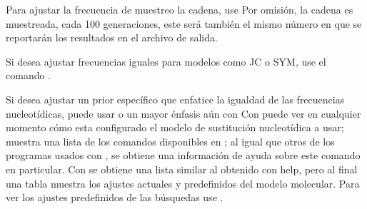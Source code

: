 Para ajustar la frecuencia de muestreo la cadena, use 
Por omisi\'on, la cadena es muestreada, cada 100 generaciones, este ser\'a tambi\'en el mismo n\'umero en que se reportar\'an los resultados en el archivo de salida.

Si  desea ajustar frecuencias iguales para modelos como JC o SYM, use el comando . 

Si desea ajustar un prior espec\'ifico que enfatice la igualdad de las frecuencias nucleot\'idicas,  puede usar 
o un mayor \'enfasis a\'un con 
Con  puede ver en cualquier momento c\'omo esta configurado el modelo de sustituci\'on nucleot\'idica a usar;  muestra una lista de los comandos disponibles en ; al igual que otros de los programas usados con , se obtiene una informaci\'on de ayuda sobre este comando en particular. Con  se obtiene una lista similar al obtenido con help, pero al final una tabla muestra los ajustes actuales y predefinidos del modelo molecular. Para ver los ajustes predefinidos de las b\'usquedas use . 


